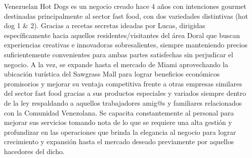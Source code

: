Venezuelan Hot Dogs es un negocio creado hace 4 años con intenciones gourmet destinadas principalmente al sector fast food, con dos variedades distintivas (hot dog 1 & 2). Gracias a recetas secretas ideadas por Lucas, dirigidas específicamente hacia aquellos residentes/visitantes del área Doral que buscan experiencias creativas e innovadoras sobresalientes, siempre manteniendo precios suficientemente convenientes para ambas partes satisfechas sin perjudicar el negocio. A la vez, se expande hasta el mercado de Miami aprovechando la ubicación turística del Sawgrass Mall para lograr beneficios económicos promisorios y mejorar su ventaja competitiva frente a otras empresas similares del sector fast food gracias a sus productos especiales y variados siempre dentro de la ley respaldando a aquellos trabajadores amig@s y familiares relacionados con la Comunidad Venezolana. Se capacita constantemente al personal para mejorar sus servicios tomando nota de lo que se requiere una alta gestión y profundizar en las operaciones que brinda la elegancia al negocio para lograr crecimiento y expansión hasta el mercado deseado previamente por aquellos hacedores del dicho.

